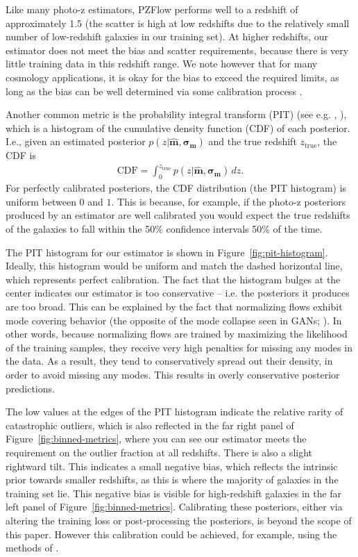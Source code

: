 \documentclass[twocolumn,twocolappendix]{aastex631}
\newcommand{\citePZa}{\citetalias{schmidt2020} \citeyear{schmidt2020}\xspace}
\begin{document}
Like many photo-z estimators, PZFlow performs well to a redshift of approximately 1.5 (the scatter is high at low redshifts due to the relatively small number of low-redshift galaxies in our training set).
At higher redshifts, our estimator does not meet the bias and scatter requirements, because there is very little training data in this redshift range.
We note however that for many cosmology applications, it is okay for the bias to exceed the required limits, as long as the bias can be well determined via some calibration process \citep{newman2015}.

Another common metric is the probability integral transform (PIT) (see e.g. \citePZa, \citealt{dey2022}), which is a histogram of the cumulative density function (CDF) of each posterior.
I.e., given an estimated posterior  $p(z| \mathbf{\hat{m}}, \mathbf{\sigma_m})$ and the true redshift $z_\text{true}$, the CDF is
\begin{align}
    \mathrm{CDF} = \int_0^{z_\text{true}} p(z| \mathbf{\hat{m}}, \mathbf{\sigma_m}) \, dz.
\end{align}
For perfectly calibrated posteriors, the CDF distribution (the PIT histogram) is uniform between $0$ and $1$.
This is because, for example, if the photo-z posteriors produced by an estimator are well calibrated you would expect the true redshifts of the galaxies to fall within the 50\% confidence intervals 50\% of the time.

The PIT histogram for our estimator is shown in Figure~\ref{fig:pit-histogram}.
Ideally, this histogram would be uniform and match the dashed horizontal line, which represents perfect calibration.
The fact that the histogram bulges at the center indicates our estimator is too conservative -- i.e. the posteriors it produces are too broad.
This can be explained by the fact that normalizing flows exhibit mode covering behavior (the opposite of the mode collapse seen in GANs; \citealt{salimans2016}).
In other words, because normalizing flows are trained by maximizing the likelihood of the training samples, they receive very high penalties for missing any modes in the data.
As a result, they tend to conservatively spread out their density, in order to avoid missing any modes.
This results in overly conservative posterior predictions.

The low values at the edges of the PIT histogram indicate the relative rarity of catastrophic outliers, which is also reflected in the far right panel of Figure~\ref{fig:binned-metrics}, where you can see our estimator meets the requirement on the outlier fraction at all redshifts.
There is also a slight rightward tilt.
This indicates a small negative bias, which reflects the intrinsic prior towards smaller redshifts, as this is where the majority of galaxies in the training set lie.
This negative bias is visible for high-redshift galaxies in the far left panel of Figure~\ref{fig:binned-metrics}.
Calibrating these posteriors, either via altering the training loss or post-processing the posteriors, is beyond the scope of this paper.
However this calibration could be achieved, for example, using the methods of \citet{dey2022}.
\end{document}
